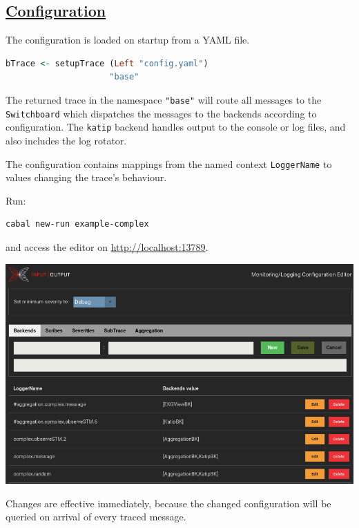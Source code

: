 \begin{mdframed}
    \section*{\href{https://github.com/input-output-hk/iohk-monitoring-framework/blob/master/iohk-monitoring/src/Cardano/BM/Configuration/Model.lhs}{Configuration}}

The configuration is loaded on startup from a YAML file.

    \begin{lstlisting}[language=Haskell]
bTrace <- setupTrace (Left "config.yaml")
                     "base"
    \end{lstlisting}

    The returned trace in the namespace \texttt{"base"} will route all messages to the \texttt{Switchboard} which dispatches the messages to the backends according to configuration. The \texttt{katip} backend handles output to the console or log files, and also includes the log rotator.

The configuration contains mappings from the named context \texttt{LoggerName} to values changing the trace's behaviour.

Run:

    \begin{lstlisting}[language=Bash]
cabal new-run example-complex
    \end{lstlisting}

and access the editor on \href{http://localhost:13789}{http://localhost:13789}.
    
{\includegraphics[scale=0.31]{tex/img/screen.png}}
    
Changes are effective immediately, because the changed configuration will be queried on arrival of every traced message.
\end{mdframed}


